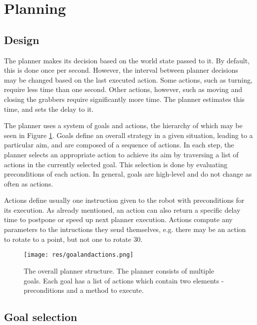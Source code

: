 \section{Planning}

\subsection{Design}

The planner makes its decision based on the world state passed to it. By
default, this is done once per second. However, the interval between planner
decisions may be changed based on the last executed action. Some actions, such
as turning, require less time than one second. Other actions, however, such as
moving and closing the grabbers require significantly more time. The planner
estimates this time, and sets the delay to it.

The planner uses a system of goals and actions, the hierarchy of which may be
seen in Figure \ref{fig:goalsandactionsstructure}. Goals define an overall
strategy in a given situation, leading to a particular aim, and are composed
of a sequence of actions. In each step, the planner selects an appropriate
action to achieve its aim by traversing a list of actions in the currently
selected goal. This selection is done by evaluating preconditions of each
action. In general, goals are high-level and do not change as often as actions.

Actions define usually one instruction given to the robot with preconditions
for its execution. As already mentioned, an action can also return a specific
delay time to postpone or speed up next planner execution. Actions compute any
parameters to the intructions they send themselves, e.g. there may be an action
to rotate to a point, but not one to rotate 30\degree.

\begin{figure}[H]
	\begin{center}
    \texttt{[image: res/goalandactions.png]}
    \caption{The overall planner structure. The planner consists of multiple goals. Each goal has a list of actions which contain two elements - preconditions and a method to execute.}
    \label{fig:goalsandactionsstructure}
	\end{center}
\end{figure}

\subsection{Goal selection}

